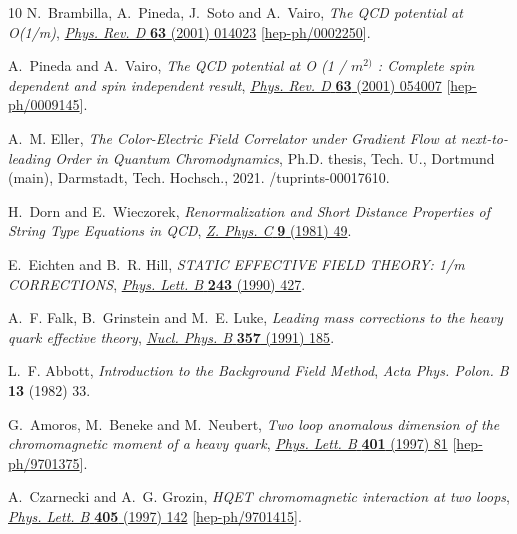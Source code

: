 \begin{thebibliography}{10}
N.~Brambilla, A.~Pineda, J.~Soto and A.~Vairo, \emph{{The QCD potential at
  O(1/m)}}, \href{https://doi.org/10.1103/PhysRevD.63.014023}{\emph{Phys. Rev.
  D} {\bfseries 63} (2001) 014023}
  [\href{https://arxiv.org/abs/hep-ph/0002250}{{\ttfamily hep-ph/0002250}}].

A.~Pineda and A.~Vairo, \emph{{The QCD potential at O (1 / $m^{2)}$ : Complete
  spin dependent and spin independent result}},
  \href{https://doi.org/10.1103/PhysRevD.64.039902}{\emph{Phys. Rev. D}
  {\bfseries 63} (2001) 054007}
  [\href{https://arxiv.org/abs/hep-ph/0009145}{{\ttfamily hep-ph/0009145}}].

A.~M. Eller, \emph{{The Color-Electric Field Correlator under Gradient Flow at
  next-to-leading Order in Quantum Chromodynamics}}, Ph.D. thesis, Tech. U.,
  Dortmund (main), Darmstadt, Tech. Hochsch., 2021.
/tuprints-00017610.

H.~Dorn and E.~Wieczorek, \emph{{Renormalization and Short Distance Properties
  of String Type Equations in {QCD}}},
  \href{https://doi.org/10.1007/BF01554111}{\emph{Z. Phys. C} {\bfseries 9}
  (1981) 49}.

E.~Eichten and B.~R. Hill, \emph{{STATIC EFFECTIVE FIELD THEORY: 1/m
  CORRECTIONS}},
  \href{https://doi.org/10.1016/0370-2693(90)91408-4}{\emph{Phys. Lett. B}
  {\bfseries 243} (1990) 427}.

A.~F. Falk, B.~Grinstein and M.~E. Luke, \emph{{Leading mass corrections to the
  heavy quark effective theory}},
  \href{https://doi.org/10.1016/0550-3213(91)90464-9}{\emph{Nucl. Phys. B}
  {\bfseries 357} (1991) 185}.

L.~F. Abbott, \emph{{Introduction to the Background Field Method}}, {\emph{Acta
  Phys. Polon. B} {\bfseries 13} (1982) 33}.

G.~Amoros, M.~Beneke and M.~Neubert, \emph{{Two loop anomalous dimension of the
  chromomagnetic moment of a heavy quark}},
  \href{https://doi.org/10.1016/S0370-2693(97)00345-6}{\emph{Phys. Lett. B}
  {\bfseries 401} (1997) 81}
  [\href{https://arxiv.org/abs/hep-ph/9701375}{{\ttfamily hep-ph/9701375}}].

A.~Czarnecki and A.~G. Grozin, \emph{{HQET chromomagnetic interaction at two
  loops}}, \href{https://doi.org/10.1016/S0370-2693(97)00587-X}{\emph{Phys.
  Lett. B} {\bfseries 405} (1997) 142}
  [\href{https://arxiv.org/abs/hep-ph/9701415}{{\ttfamily hep-ph/9701415}}].


\end{thebibliography}
